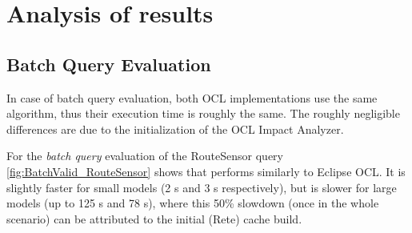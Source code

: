 \section{Analysis of results}


\subsection{Batch Query Evaluation}
In case of batch query evaluation, both OCL implementations use the same
algorithm, thus their execution time is roughly the same. The roughly negligible
differences are due to the initialization of the OCL Impact Analyzer.

For the \emph{batch query} evaluation of the \textsf{RouteSensor} query
\autoref{fig:BatchValid_RouteSensor} shows that \incquery{} performs similarly
to Eclipse OCL. It is slightly faster for small models (2 s and 3 s
respectively), but is slower for large models (up to 125 s and 78 s), where
this 50\% slowdown (once in the whole scenario) can be attributed to the
initial (Rete) cache build.



